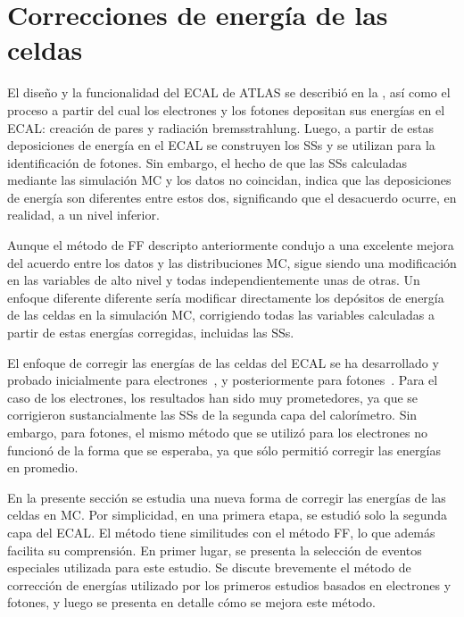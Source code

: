 \section{Correcciones de energ\'ia de las celdas}
\label{sec:ss_corrections:cell_rw}

El diseño y la funcionalidad del \ac{ECAL} de \ac{ATLAS} se describi\'o en la \Sect{\ref{subsubsec:atlas:atlas:cals:ecal}}, así como el proceso a partir del cual los electrones y los fotones depositan sus energías en el \ac{ECAL}: creación de pares y radiación bremsstrahlung. Luego, a partir de estas deposiciones de energía en el \ac{ECAL} se construyen los \acp{SS} y se utilizan para la identificación de fotones. Sin embargo, el hecho de que las \acp{SS} calculadas mediante las simulaci\'on \ac{MC} y los datos no coincidan, indica que las deposiciones de energía son diferentes entre estos dos, significando que el desacuerdo ocurre, en realidad, a un nivel inferior.

Aunque el método de \ac{FF} descripto anteriormente condujo a una excelente mejora del acuerdo entre los datos y las distribuciones \ac{MC}, sigue siendo una modificación en las variables de alto nivel y todas independientemente unas de otras. Un enfoque diferente diferente ser\'ia modificar directamente los depósitos de energía de las celdas en la simulación \ac{MC}, corrigiendo todas las variables calculadas a partir de estas energ\'ias corregidas, incluidas las \acp{SS}.


El enfoque de corregir las energ\'ias de las celdas del \ac{ECAL} se ha desarrollado y probado inicialmente para electrones~\cite{thesis_khandoga}, y posteriormente para fotones~\cite{thesis_belfkir}. Para el caso de los electrones, los resultados han sido muy prometedores, ya que se corrigieron sustancialmente las \acp{SS} de la segunda capa del calor\'imetro. Sin embargo, para fotones, el mismo método que se utilizó para los electrones no funcion\'o de la forma que se esperaba, ya que sólo permiti\'o corregir las energ\'ias en promedio.

En la presente sección se estudia una nueva forma de corregir las energías de las celdas en \ac{MC}. Por simplicidad, en una primera etapa, se estudi\'o solo la segunda capa del \ac{ECAL}. El método tiene similitudes con el método \ac{FF}, lo que adem\'as facilita su comprensión.
En primer lugar, se presenta la selección de eventos especiales utilizada para este estudio. Se discute brevemente el m\'etodo de correcci\'on de energ\'ias utilizado por los primeros estudios basados en electrones y fotones, y luego se presenta en detalle cómo se mejora este método.






